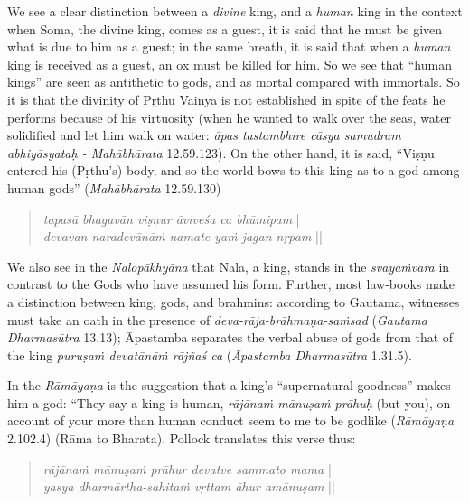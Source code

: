 We see a clear distinction between a {\sl divine} king, and a {\sl human} king in the context when Soma, the divine king, comes as a guest, it is said that he must be given what is due to him as a guest; in the same breath, it is said that when a {\sl human} king is received as a guest, an ox must be killed for him.  So we see that “human kings” are seen as antithetic to gods, and as mortal compared with immortals. So it is that the divinity of Pṛthu Vainya is not established in spite of the feats he performs because of his virtuosity (when he wanted to walk over the seas, water solidified and let him walk on water: {\sl āpas tastambhire cāsya samudram abhiyāsyataḥ - Mahābhārata} 12.59.123). On the other hand, it is said, “Viṣṇu entered his (Pṛthu’s) body, and so the world bows to this king as to a god among human gods” ({\sl Mahābhārata} 12.59.130)
\begin{quote}
{\sl tapasā bhagavān viṣṇur āviveśa ca bhūmipam} |\\ 
{\sl devavan naradevānāṁ namate yaṁ jagan nṛpam} ||
\end{quote}

We also see in the {\sl Nalopākhyāna} that Nala, a king, stands in the {\sl svayaṁvara} in contrast to the Gods who have assumed his form. Further, most law-books make a distinction between king, gods, and brahmins: according to Gautama, witnesses must take an oath in the presence of {\sl deva-rāja-brāhmaṇa-saṁsad} ({\sl Gautama Dharmasūtra} 13.13); Āpastamba separates the verbal abuse of gods from that of the king {\sl puruṣaṁ devatānāṁ rājñaś ca} ({\sl Āpastamba Dharmasūtra} 1.31.5). 

In the {\sl Rāmāyaṇa} is the suggestion that a king’s “supernatural goodness” makes him a god: “They say a king is human, {\sl rājānaṁ mānuṣaṁ prāhuḥ} (but you), on account of your more than human conduct seem to me to be godlike ({\sl Rāmāyaṇa} 2.102.4) (Rāma to Bharata). Pollock translates this verse thus:  
\begin{quote}
{{\sl rājānaṁ mānuṣaṁ prāhur devatve sammato mama}} |\\
{\sl yasya dharmārtha-sahitaṁ vṛttam āhur amānuṣam} || 
\end{quote}

